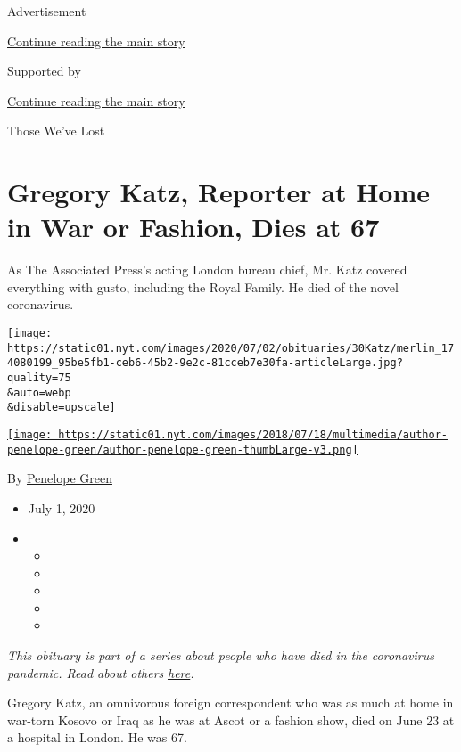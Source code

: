 Advertisement

\protect\hyperlink{after-top}{Continue reading the main story}

Supported by

\protect\hyperlink{after-sponsor}{Continue reading the main story}

Those We've Lost

\hypertarget{gregory-katz-reporter-at-home-in-war-or-fashion-dies-at-67}{%
\section{Gregory Katz, Reporter at Home in War or Fashion, Dies at
67}\label{gregory-katz-reporter-at-home-in-war-or-fashion-dies-at-67}}

As The Associated Press's acting London bureau chief, Mr. Katz covered
everything with gusto, including the Royal Family. He died of the novel
coronavirus.

\texttt{[image: https://static01.nyt.com/images/2020/07/02/obituaries/30Katz/merlin\_174080199\_95be5fb1-ceb6-45b2-9e2c-81cceb7e30fa-articleLarge.jpg?quality=75\\\&auto=webp\\\&disable=upscale]}

\href{https://www.nytimes.com/by/penelope-green}{\texttt{[image: https://static01.nyt.com/images/2018/07/18/multimedia/author-penelope-green/author-penelope-green-thumbLarge-v3.png]}}

By \href{https://www.nytimes.com/by/penelope-green}{Penelope Green}

\begin{itemize}
\item
  July 1, 2020
\item
  \begin{itemize}
  \item
  \item
  \item
  \item
  \item
  \end{itemize}
\end{itemize}

\emph{This obituary is part of a series about people who have died in
the coronavirus pandemic. Read about others}
\href{https://www.nytimes.com/series/people-who-have-died-of-the-coronavirus}{\emph{here}}\emph{.}

Gregory Katz, an omnivorous foreign correspondent who was as much at
home in war-torn Kosovo or Iraq as he was at Ascot or a fashion show,
died on June 23 at a hospital in London. He was 67.

